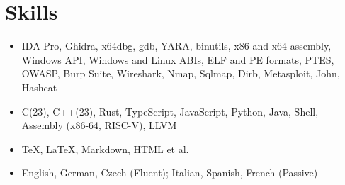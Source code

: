 \documentclass{customcv}
\begin{document}
    
\section{Skills}
    \begin{itemize}
      \item IDA Pro, Ghidra, x64dbg, gdb, YARA, binutils, x86 and x64 assembly, Windows API, Windows and Linux ABIs, ELF and PE formats, PTES, OWASP, Burp Suite, Wireshark, Nmap, Sqlmap, Dirb, Metasploit, John, Hashcat
    \end{itemize}

    \begin{itemize}
      \item C(23), C++(23), Rust, TypeScript, JavaScript, Python, Java, Shell, Assembly (x86-64, RISC-V), LLVM

      \item \TeX, \LaTeX, Markdown, HTML et al.

      \item English, German, Czech (Fluent); Italian, Spanish, French (Passive)
    \end{itemize}
\end{document}
